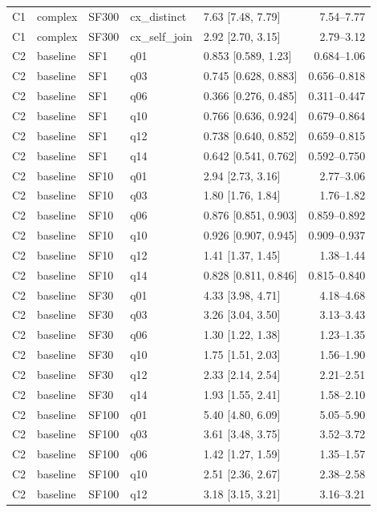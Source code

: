 \begin{longtable}{lllllr}
C1 & complex & SF300 & cx\_distinct & 7.63 [7.48, 7.79] & 7.54--7.77 \\
C1 & complex & SF300 & cx\_self\_join & 2.92 [2.70, 3.15] & 2.79--3.12 \\
C2 & baseline & SF1 & q01 & 0.853 [0.589, 1.23] & 0.684--1.06 \\
C2 & baseline & SF1 & q03 & 0.745 [0.628, 0.883] & 0.656--0.818 \\
C2 & baseline & SF1 & q06 & 0.366 [0.276, 0.485] & 0.311--0.447 \\
C2 & baseline & SF1 & q10 & 0.766 [0.636, 0.924] & 0.679--0.864 \\
C2 & baseline & SF1 & q12 & 0.738 [0.640, 0.852] & 0.659--0.815 \\
C2 & baseline & SF1 & q14 & 0.642 [0.541, 0.762] & 0.592--0.750 \\
C2 & baseline & SF10 & q01 & 2.94 [2.73, 3.16] & 2.77--3.06 \\
C2 & baseline & SF10 & q03 & 1.80 [1.76, 1.84] & 1.76--1.82 \\
C2 & baseline & SF10 & q06 & 0.876 [0.851, 0.903] & 0.859--0.892 \\
C2 & baseline & SF10 & q10 & 0.926 [0.907, 0.945] & 0.909--0.937 \\
C2 & baseline & SF10 & q12 & 1.41 [1.37, 1.45] & 1.38--1.44 \\
C2 & baseline & SF10 & q14 & 0.828 [0.811, 0.846] & 0.815--0.840 \\
C2 & baseline & SF30 & q01 & 4.33 [3.98, 4.71] & 4.18--4.68 \\
C2 & baseline & SF30 & q03 & 3.26 [3.04, 3.50] & 3.13--3.43 \\
C2 & baseline & SF30 & q06 & 1.30 [1.22, 1.38] & 1.23--1.35 \\
C2 & baseline & SF30 & q10 & 1.75 [1.51, 2.03] & 1.56--1.90 \\
C2 & baseline & SF30 & q12 & 2.33 [2.14, 2.54] & 2.21--2.51 \\
C2 & baseline & SF30 & q14 & 1.93 [1.55, 2.41] & 1.58--2.10 \\
C2 & baseline & SF100 & q01 & 5.40 [4.80, 6.09] & 5.05--5.90 \\
C2 & baseline & SF100 & q03 & 3.61 [3.48, 3.75] & 3.52--3.72 \\
C2 & baseline & SF100 & q06 & 1.42 [1.27, 1.59] & 1.35--1.57 \\
C2 & baseline & SF100 & q10 & 2.51 [2.36, 2.67] & 2.38--2.58 \\
C2 & baseline & SF100 & q12 & 3.18 [3.15, 3.21] & 3.16--3.21 \\

\end{longtable}
